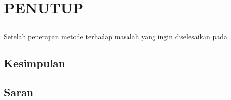 \chapter{PENUTUP}
\label{sec:chap5_tutup}
\vspace{1ex}
\section*{}
Setelah penerapan metode terhadap masalah yang ingin diselesaikan pada \vspace{1ex}

\section{Kesimpulan}
\label{sec:sec4_kesimpulan}
\vspace{1ex}
\lipsum[1]
\section{Saran}
\label{sec:sec4_saran}
\vspace{1ex}
\lipsum[2]

